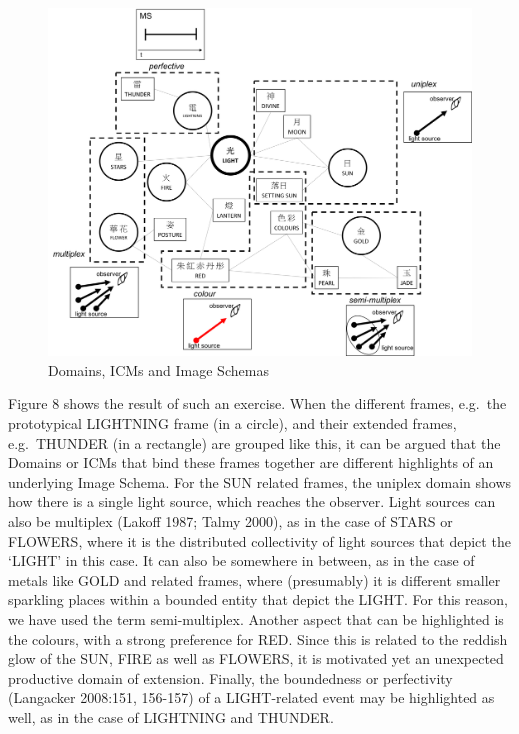 \begin{figure}
\includegraphics[width=27.64in]{ideos/domain2} \caption{Domains, ICMs and Image Schemas}\label{fig:domains}
\end{figure}

Figure 8 shows the result of such an exercise. When the different
frames, e.g.~the prototypical LIGHTNING frame (in a circle), and their
extended frames, e.g.~THUNDER (in a rectangle) are grouped like this, it
can be argued that the Domains or ICMs that bind these frames together
are different highlights of an underlying Image Schema. For the SUN
related frames, the uniplex domain shows how there is a single light
source, which reaches the observer. Light sources can also be multiplex
(Lakoff 1987; Talmy 2000), as in the case of STARS or FLOWERS, where it
is the distributed collectivity of light sources that depict the `LIGHT'
in this case. It can also be somewhere in between, as in the case of
metals like GOLD and related frames, where (presumably) it is different
smaller sparkling places within a bounded entity that depict the LIGHT.
For this reason, we have used the term semi-multiplex. Another aspect
that can be highlighted is the colours, with a strong preference for
RED. Since this is related to the reddish glow of the SUN, FIRE as well
as FLOWERS, it is motivated yet an unexpected productive domain of
extension. Finally, the boundedness or perfectivity (Langacker 2008:151,
156-157) of a LIGHT-related event may be highlighted as well, as in the
case of LIGHTNING and THUNDER.

